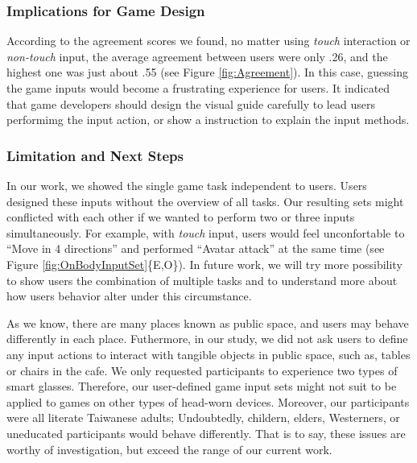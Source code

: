 \documentclass{sigchi}
\begin{document}
  \subsubsection{Implications for Game Design}
  According to the agreement scores we found, no matter using \emph{touch} interaction or \emph{non-touch} input, the average agreement between users were only .26, and the highest one was just about .55 (see Figure \ref{fig:Agreement}). In this case, guessing the game inputs would become a frustrating experience for users. It indicated that game developers should design the visual guide carefully to lead users performimg the input action, or show a instruction to explain the input methods.




  \subsubsection{Limitation and Next Steps}

  In our work, we showed the single game task independent to users. Users designed these inputs without the overview of all tasks. Our resulting sets might conflicted with each other if we wanted to perform two or three inputs simultaneously. For example, with \emph{touch} input, users would feel unconfortable to ``Move in 4 directions'' and performed ``Avatar attack'' at the same time (see Figure \ref{fig:OnBodyInputSet}\{E,O\}). In future work, we will try more possibility to show users the combination of multiple tasks and to understand more about how users behavior alter under this circumstance.

  As we know, there are many places known as public space, and users may behave differently in each place. Futhermore, in our study, we did not ask users to define any input actions to interact with tangible objects in public space, such as, tables or chairs in the cafe. We only requested participants to experience two types of smart glasses. Therefore, our user-defined game input sets might not suit to be applied to games on other types of head-worn devices. Moreover, our participants were all literate Taiwanese adults; Undoubtedly, childern, elders, Westerners, or uneducated participants would behave differently. That is to say, these issues are worthy of investigation, but exceed the range of our current work.
\end{document}
